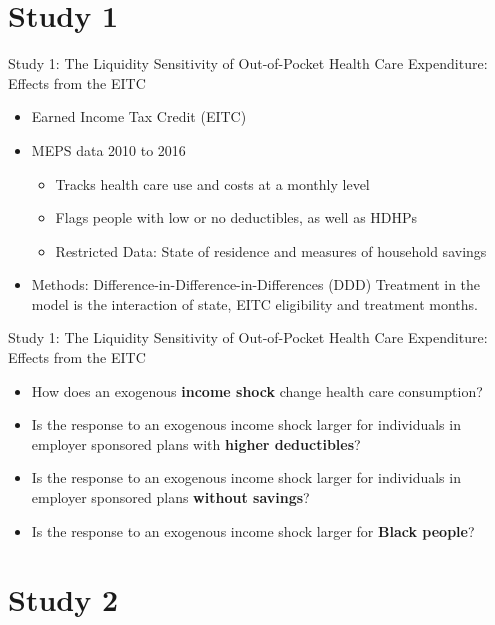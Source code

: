 \documentclass[t, hyperref={colorlinks=true}, compress]{beamer}
\begin{document}
\section{Study 1}

\begin{frame}{Study 1: The Liquidity Sensitivity of Out-of-Pocket Health Care Expenditure: Effects from the EITC}
\begin{itemize}
\item Earned Income Tax Credit (EITC)
\bigskip
\item MEPS data 2010 to 2016 
\bigskip
\begin{itemize}
\item Tracks health care use and costs at a monthly level
\item Flags people with low or no deductibles, as well as HDHPs
\item Restricted Data: State of residence and measures of household savings 
\end{itemize}
\bigskip
\bigskip
\item Methods: Difference-in-Difference-in-Differences (DDD) Treatment in the model is the interaction of state, EITC eligibility and treatment months.  

\end{itemize}
\end{frame}

\begin{frame}{Study 1: The Liquidity Sensitivity of Out-of-Pocket Health Care Expenditure: Effects from the EITC} 
\begin{itemize}
\item	How does an exogenous \textbf{income shock} change health care consumption?
\bigskip
\item	Is the response to an exogenous income shock larger for individuals in employer sponsored plans with \textbf{higher deductibles}?
\bigskip
\item Is the response to an exogenous income shock larger for individuals in employer sponsored plans \textbf{without savings}?
\bigskip
\item Is the response to an exogenous income shock larger for \textbf{Black people}? 
\end{itemize}

\end{frame}

\section{Study 2}
\end{document}
